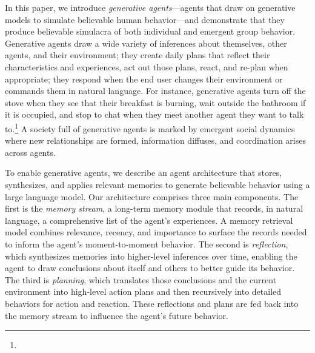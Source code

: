 In this paper, we introduce \textit{generative agents}---agents that draw on generative models to simulate believable human behavior---and demonstrate that they produce believable simulacra of both individual and emergent group behavior. Generative agents draw a wide variety of inferences about themselves, other agents, and their environment; they create daily plans that reflect their characteristics and experiences, act out those plans, react, and re-plan when appropriate; they respond when the end user changes their environment or commands them in natural language. For instance, generative agents turn off the stove when they see that their breakfast is burning, wait outside the bathroom if it is occupied, and stop to chat when they meet another agent they want to talk to.\footnote{{\color{black}{When referring to generative agents engaging in actions or going to places, this is a shorthand for readability and not a suggestion that they are engaging in human-like agency. The behaviors of our agents, akin to animated Disney characters, aim to create a sense of believability, but they do not imply genuine agency.}}} A society full of generative agents is marked by emergent social dynamics where new relationships are formed, information diffuses, and coordination arises across agents. 

To enable generative agents, we describe an agent architecture that stores, synthesizes, and applies relevant memories to generate believable behavior using a large language model. Our architecture comprises three main components. The first is the \textit{memory stream}, a long-term memory module that records, in natural language, a comprehensive list of the agent's experiences. A memory retrieval model combines relevance, recency, and importance to surface the records needed to inform the agent's moment-to-moment behavior. The second is \textit{reflection}, which synthesizes memories into higher-level inferences over time, enabling the agent to draw conclusions about itself and others to better guide its behavior. The third is \textit{planning}, which translates those conclusions and the current environment into high-level action plans and then recursively into detailed behaviors for action and reaction. These reflections and plans are fed back into the memory stream to influence the agent's future behavior.

